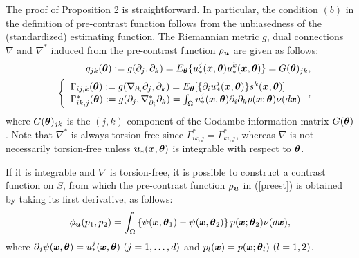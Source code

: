 \documentclass[graybox]{svmult}
\newcommand{\bm}[1]{\mbox{\boldmath $#1$}}
\newcommand{\bms}[1]{\mbox{\scriptsize\boldmath $#1$}}
\begin{document}
The proof of Proposition 2 is straightforward. In particular, the condition $(b)$ in the
definition of pre-contrast function follows from the unbiasedness of the (standardized)
estimating function.
The Riemannian metric $g$, dual connections $\nabla$ and $\nabla^{\ast}$ induced from
the pre-contrast function $\rho_{\bms{u}}$ are given as follows:
%
\begin{eqnarray*}
   &&g_{jk}(\bm{\theta}) := g(\partial_j,\partial_k)
                          = E_{\bms{\theta}}\{u_{\ast}^j(\bm{x},\bm{\theta})
                            u_{\ast}^k(\bm{x},\bm{\theta})\}
                          = G(\bm{\theta})_{jk}, 
                          \label{Godambe} \\
   &&\left\{\begin{array}{l}
             \Gamma_{ij,k}(\bm{\theta}) := g(\nabla_{\partial_i}\partial_j,\partial_k)
             = E_{\bms{\theta}}[\{\partial_iu_{\ast}^j(\bm{x},\bm{\theta})\}s^k(\bm{x},\bm{\theta})] \\
             \Gamma^{\ast}_{ik,j}(\bm{\theta}) 
             := g(\partial_j,\nabla^{\ast}_{\partial_i}\partial_k)
              = \int_{\Omega}u_{\ast}^j(\bm{x},\bm{\theta})\partial_i\partial_kp(\bm{x};\bm{\theta})
                \nu(d\bm{x})
            \end{array}
     \right., \label{dualconn}
\end{eqnarray*}
%
where $G(\bm{\theta})_{jk}$ is the $(j,k)$ component of the Godambe information matrix 
$G(\bm{\theta})$. Note that $\nabla^{\ast}$ is always torsion-free since 
$\Gamma^{\ast}_{ik,j}=\Gamma^{\ast}_{ki,j}$, whereas $\nabla$ is not necessarily 
torsion-free unless $\bm{u}_{\ast}(\bm{x},\bm{\theta})$ is integrable with respect to
$\bm{\theta}$.

If it is integrable and $\nabla$ is torsion-free, it is possible to construct a contrast
function on $S$, from which the pre-contrast function $\rho_{\bms{u}}$ in (\ref{preest})
is obtained by taking its first derivative, as follows:
%
\begin{eqnarray*}
   \phi_{\bms{u}}(p_1,p_2) = \int_{\Omega}\left\{\psi(\bm{x},\bm{\theta}_1) - \psi(\bm{x},\bm{\theta}_2)
                             \right\}p(\bm{x};\bm{\theta}_2)\nu(d\bm{x}),
\end{eqnarray*}
%
where $\partial_j\psi(\bm{x},\bm{\theta})=u_{\ast}^j(\bm{x},\bm{\theta}) \ (j=1,\ldots,d)$
and $p_l(\bm{x})=p(\bm{x};\bm{\theta}_l) \ (l=1,2)$.

\end{document}
